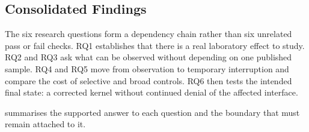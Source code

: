 \subsection{Consolidated Findings}

The six research questions form a dependency chain rather than six unrelated
pass or fail checks. RQ1 establishes that there is a real laboratory effect to
study. RQ2 and RQ3 ask what can be observed without depending on one published
sample. RQ4 and RQ5 move from observation to temporary interruption and compare
the cost of selective and broad controls. RQ6 then tests the intended final
state: a corrected kernel without continued denial of the affected interface.

 summarises the supported answer to each question
and the boundary that must remain attached to it.


